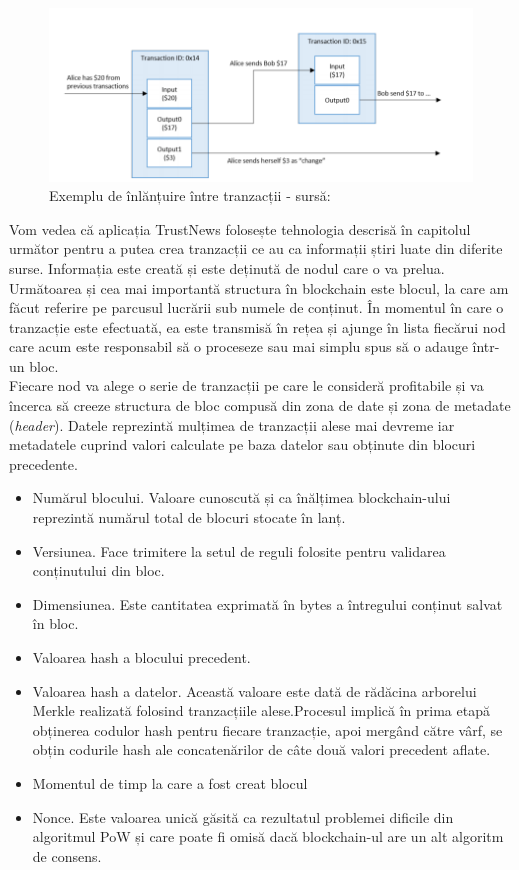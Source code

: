 \begin{figure}[H] 
\centering
\includegraphics[scale=0.575]{Images/BC_Transaction.png}
\caption{Exemplu de înlănțuire între tranzacții - sursă: \cite{Blockchain_Overview_NIST}}
\end{figure}

Vom vedea că aplicația TrustNews folosește tehnologia descrisă în capitolul următor pentru a putea crea tranzacții ce au ca informații știri luate din diferite surse. Informația este creată și este deținută de nodul care o va prelua.\\

Următoarea și cea mai importantă structura în blockchain este blocul, la care am făcut referire pe parcusul lucrării sub numele de conținut. În momentul în care o tranzacție este efectuată, ea este transmisă în rețea și ajunge în lista fiecărui nod care acum este responsabil să o proceseze sau mai simplu spus să o adauge într-un bloc.\\

Fiecare nod va alege o serie de tranzacții pe care le consideră profitabile și va încerca să creeze structura de bloc compusă din zona de date și zona de metadate (\textit{header}). Datele reprezintă mulțimea de tranzacții alese mai devreme iar metadatele cuprind valori calculate pe baza datelor sau obținute din blocuri precedente.\\

\begin{itemize}
    \item Numărul blocului. Valoare cunoscută și ca înălțimea blockchain-ului reprezintă numărul total de blocuri stocate în lanț.
    \item Versiunea. Face trimitere la setul de reguli folosite pentru validarea conținutului din bloc.
    \item Dimensiunea. Este cantitatea exprimată în bytes a întregului conținut salvat în bloc.
    \item Valoarea hash a blocului precedent. 
    \item Valoarea hash a datelor. Această valoare este dată de rădăcina arborelui Merkle realizată folosind tranzacțiile alese.Procesul implică în prima etapă obținerea codulor hash pentru fiecare tranzacție, apoi mergând către vârf, se obțin codurile hash ale concatenărilor de câte două valori precedent aflate. 
    \item Momentul de timp la care a fost creat blocul
    \item Nonce. Este valoarea unică găsită ca rezultatul problemei dificile din algoritmul PoW și care poate fi omisă dacă blockchain-ul are un alt algoritm de consens.
\end{itemize}

